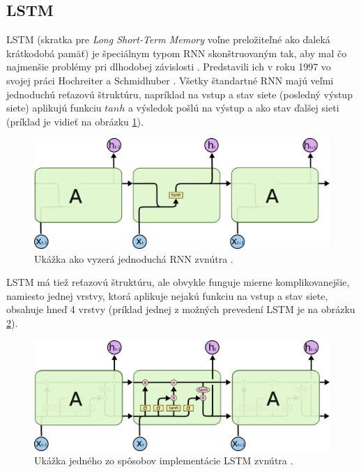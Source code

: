 \subsection{LSTM}
LSTM (skratka pre \textit{Long Short-Term Memory} voľne preložiteľné ako ďaleká krátkodobá pamäť) je špeciálnym typom RNN skonštruovaným tak, aby mal čo najmenšie problémy pri dlhodobej závislosti \citep{rnn:colah}. 
Predstavili ich v roku 1997 vo svojej práci Hochreiter a Schmidhuber \citep{rnn:hoch}.
Všetky štandartné RNN majú veľmi jednoduchú reťazovú štruktúru, napríklad na vstup a stav siete (posledný výstup siete) aplikujú funkciu $tanh$ a výsledok pošlú na výstup a ako stav ďalšej sieti (príklad je vidieť na obrázku \ref{simple_rnn}). 
\begin{figure}  [h!]
\includegraphics[width=\textwidth]{../img/simple_rnn.png}
\caption{Ukážka ako vyzerá jednoduchá RNN zvnútra \citep{rnn:colah}.}
\label{simple_rnn}
\end{figure}

LSTM má tiež reťazovú štruktúru, ale obvykle funguje mierne komplikovanejšie, namiesto jednej vrstvy, ktorá aplikuje nejakú funkciu na vstup a stav siete, obsahuje hneď 4 vrstvy (príklad jednej z možných prevedení LSTM je na obrázku \ref{lstm}).
\begin{figure}  [h!]
\includegraphics[width=\textwidth]{../img/lstm.png}
\caption{Ukážka jedného zo spôsobov implementácie LSTM zvnútra \citep{rnn:colah}.}
\label{lstm}
\end{figure}

